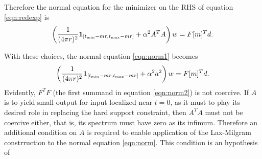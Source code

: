 Therefore the normal equation for the minimizer on the RHS of equation \ref{eqn:redexp} is
\begin{equation}
  \label{eqn:norm1}
  \left(\frac{1}{(4\pi r)^2} {\bf 1}_{[t_{\rm min}-mr,  
      t_{\rm max}-mr]} + \alpha^2 A^TA\right)w= F[m]^Td.
\end{equation}

With these choices, the normal equation \ref{eqn:norm1} becomes
\begin{equation}
\label{eqn:norm2}
\left(\frac{1}{(4\pi r)^2}  {\bf 1}_{[t_{\rm min}-mr,  
      t_{\rm max}-mr]} + \alpha^2a^2\right)w= F[m]^Td.
\end{equation}
Evidently, $F^TF$ (the first summand in equation \ref{eqn:norm2}) is
not coercive. If $A$ is to yield small output for input localized near
$t=0$, as it must to play its desired role in replacing the hard
support constraint, then $A^TA$ must not be coercive either, that is,
its spectrum must have zero as its infimum. Therefore an additional
condition on $A$ is required to enable application of the Lax-Milgram
constrruction to the normal
equation \ref{eqn:norm}. This condition is an hypothesis of 

